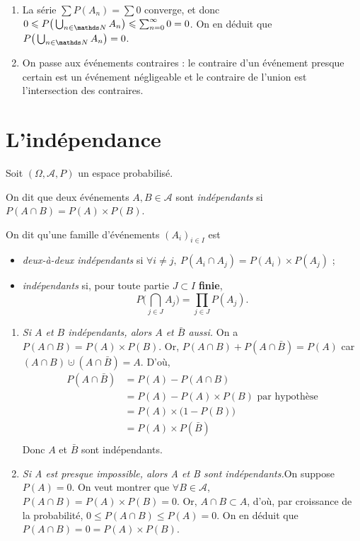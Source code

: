\begin{prv}
	\begin{enumerate}
		\item La série $\sum P(A_n) = \sum 0$\/ converge, et donc $0 \le P\big(\bigcup_{n \in \N} A_n\big) \le \sum_{n=0}^\infty 0 = 0$. On en déduit que $P\big(\bigcup_{n\in \N} A_n\big) = 0$.
		\item On passe aux événements contraires : le contraire d'un événement presque certain est un événement négligeable et le contraire de l'union est l'intersection des contraires.
	\end{enumerate}
\end{prv}

\section{L'indépendance}

\begin{defn}
	Soit $(\Omega, \mathcal{A}, P)$\/ un espace probabilisé.

	On dit que deux événements $A,B \in \mathcal{A}$\/ sont \textit{indépendants} si $P(A \cap B) = P(A) \times P(B)$.

	On dit qu'une famille d'événements $(A_i)_{i \in I}$\/ est 
	\begin{itemize}
		\item \textit{deux-à-deux indépendants} si \hfill $\forall i \neq j,\: P(A_i \cap A_j) = P(A_i) \times P(A_j)$\/ ;\hfill\null
		\item \textit{indépendants} si, pour toute partie $J \subset I$ \textbf{finie}, \[
				P\Big(\bigcap_{j \in J} A_j\Big) = \prod_{j \in J} P(A_j)
			.\]
	\end{itemize}
\end{defn}

\begin{exo}
	\begin{enumerate}
		\item \textsl{Si $A$\/ et $B$\/ indépendants, alors $A$\/ et $\bar{B}$\/ aussi.} On a $P(A \cap B) = P(A) \times P(B)$. Or, $P(A \cap B) + P(A \cap \bar{B}) = P(A)$\/ car $(A \cap B) \cupdot (A \cap \bar{B}) = A$. D'où,
			\begin{align*}
				P(A \cap \bar{B}) &= P(A) - P(A \cap B) \\
				&= P(A) - P(A) \times P(B) \text{ par hypothèse}\\
				&= P(A) \times \big(1 - P(B)\big) \\
				&= P(A) \times P(\bar{B}) \\
			\end{align*}
			Donc $A$\/ et $\bar{B}$\/ sont indépendants.
		\item \textsl{Si A est presque impossible, alors A et B sont indépendants.}\@ On suppose $P(A) = 0$. On veut montrer que $\forall B \in \mathcal{A}$, $P(A \cap B) = P(A) \times P(B) = 0$. Or, $A \cap B \subset A$, d'où, par croissance de la probabilité, $0 \le P(A \cap B) \le P(A) = 0$. On en déduit que $P(A \cap B) = 0 = P(A) \times P(B)$.
	\end{enumerate}
\end{exo}

